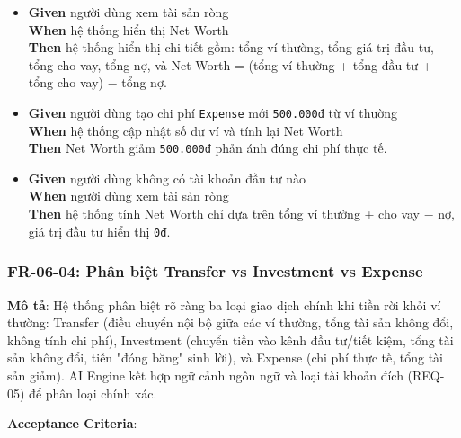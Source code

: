 \begin{itemize}
\item \textbf{Given} người dùng xem tài sản ròng  \\ \hspace*{1.5em}  \textbf{When} hệ thống hiển thị Net Worth  \\ \hspace*{1.5em}  \textbf{Then} hệ thống hiển thị chi tiết gồm: tổng ví thường, tổng giá trị đầu tư, tổng cho vay, tổng nợ, và Net Worth = (tổng ví thường + tổng đầu tư + tổng cho vay) − tổng nợ.
\item \textbf{Given} người dùng tạo chi phí \texttt{Expense} mới \texttt{500.000đ} từ ví thường  \\ \hspace*{1.5em}  \textbf{When} hệ thống cập nhật số dư ví và tính lại Net Worth  \\ \hspace*{1.5em}  \textbf{Then} Net Worth giảm \texttt{500.000đ} phản ánh đúng chi phí thực tế.
\item \textbf{Given} người dùng không có tài khoản đầu tư nào  \\ \hspace*{1.5em}  \textbf{When} người dùng xem tài sản ròng  \\ \hspace*{1.5em}  \textbf{Then} hệ thống tính Net Worth chỉ dựa trên tổng ví thường + cho vay − nợ, giá trị đầu tư hiển thị \texttt{0đ}.
\end{itemize}
\subsubsection{FR-06-04: Phân biệt Transfer vs Investment vs Expense}

\textbf{Mô tả}: Hệ thống phân biệt rõ ràng ba loại giao dịch chính khi tiền rời khỏi ví thường: Transfer (điều chuyển nội bộ giữa các ví thường, tổng tài sản không đổi, không tính chi phí), Investment (chuyển tiền vào kênh đầu tư/tiết kiệm, tổng tài sản không đổi, tiền "đóng băng" sinh lời), và Expense (chi phí thực tế, tổng tài sản giảm). AI Engine kết hợp ngữ cảnh ngôn ngữ và loại tài khoản đích (REQ-05) để phân loại chính xác.



\textbf{Acceptance Criteria}:

